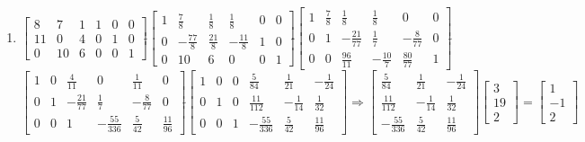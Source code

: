 \documentclass[12pt]{article}
\begin{document}
\begin{enumerate}
  \item  $\left[ \begin{array}{ccc|ccc} 8 & 7 & 1 & 1 & 0 & 0\\ 11 & 0 & 4 & 0 & 1 & 0\\ 0 & 10 & 6 & 0 & 0 & 1  \end{array} \right]\widetilde{ }\left[ \begin{array}{ccc|ccc} 1 & \frac{7}{8} & \frac{1}{8} & \frac{1}{8} & 0 & 0\\ 0 & -\frac{77}{8} & \frac{21}{8} & -\frac{11}{8} & 1 & 0\\ 0 & 10 & 6 & 0 & 0 & 1  \end{array} \right]\widetilde{ }\left[ \begin{array}{ccc|ccc} 1 & \frac{7}{8} & \frac{1}{8} & \frac{1}{8} & 0 & 0\\ 0 & 1 & -\frac{21}{77} & \frac{1}{7} & -\frac{8}{77} & 0\\ 0 & 0 & \frac{96}{11} & -\frac{10}{7} & \frac{80}{77} & 1  \end{array} \right]\widetilde{ }$\\
    $\left[ \begin{array}{ccc|ccc} 1 & 0 & \frac{4}{11} & 0 & \frac{1}{11} & 0\\ 0 & 1 & -\frac{21}{77} & \frac{1}{7} & -\frac{8}{77} & 0\\ 0 & 0 & 1 & -\frac{55}{336} & \frac{5}{42} & \frac{11}{96}  \end{array} \right]\widetilde{ }\left[ \begin{array}{ccc|ccc} 1 & 0 & 0 & \frac{5}{84} & \frac{1}{21} & -\frac{1}{24}\\ 0 & 1 & 0 & \frac{11}{112} & -\frac{1}{14} & \frac{1}{32}\\ 0 & 0 & 1 & -\frac{55}{336} & \frac{5}{42} & \frac{11}{96}  \end{array} \right]\Rightarrow\begin{bmatrix}\frac{5}{84} & \frac{1}{21} & -\frac{1}{24}\\ \frac{11}{112} & -\frac{1}{14} & \frac{1}{32}\\ -\frac{55}{336} & \frac{5}{42} & \frac{11}{96} \end{bmatrix}\begin{bmatrix} 3\\19\\2  \end{bmatrix}=\begin{bmatrix} 1\\-1\\2 \end{bmatrix}$


\end{enumerate}
\end{document}
